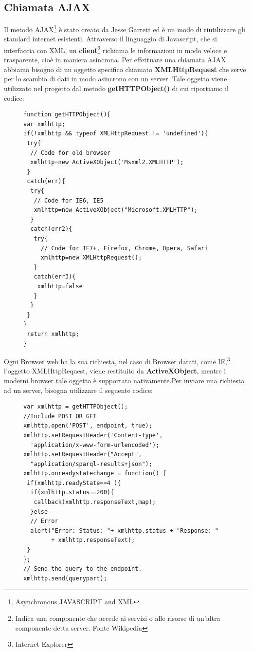 \documentclass[a4paper,11pt]{article}
\begin{document}
\subsection{Chiamata AJAX}
\label{sec:5.3}
Il metodo AJAX\footnote{Asynchronous JAVASCRIPT and XML} è stato creato da Jesse Garrett ed è un modo di riutilizzare gli standard internet esistenti. 
Attraverso il linguaggio di Javascript, che si interfaccia con XML, un \textbf{client}\footnote{Indica una componente che accede ai servizi o alle risorse di un'altra componente detta server. Fonte Wikipedia} richiama le informazioni in modo veloce e trasparente, cioè in maniera asincrona. Per effettuare una chiamata AJAX abbiamo bisogno di un oggetto specifico chiamato \textbf{XMLHttpRequest} che serve per lo scambio di dati in modo asincrono con un server.
Tale oggetto viene utilizzato nel progetto dal metodo \textbf{getHTTPObject()}
di cui riportiamo il codice:
\begin{figure}[htb]
\begin{lstlisting}[style=htmlcssjs]
function getHTTPObject(){
var xmlhttp;
if(!xmlhttp && typeof XMLHttpRequest != 'undefined'){
 try{
  // Code for old browser
  xmlhttp=new ActiveXObject('Msxml2.XMLHTTP');
 }
 catch(err){
  try{
   // Code for IE6, IE5
   xmlhttp=new ActiveXObject("Microsoft.XMLHTTP");
  }
  catch(err2){
   try{
	 // Code for IE7+, Firefox, Chrome, Opera, Safari
	 xmlhttp=new XMLHttpRequest();
   }
   catch(err3){
    xmlhttp=false
   }
  }			
 }
}
 return xmlhttp;
}		
\end{lstlisting}
\end{figure}\newline
Ogni Browser web ha la sua richiesta, nel caso di Browser datati, come IE,\footnote{Internet Explorer} l'oggetto XMLHttpRequest, viene restituito da \textbf{ActiveXObject}, mentre i moderni browser tale oggetto è supportato nativamente.\newpage Per inviare una richiesta ad un server, bisogna utilizzare il seguente codice:
\begin{figure}[htb]
\begin{lstlisting}[style=htmlcssjs]
var xmlhttp = getHTTPObject();
//Include POST OR GET
xmlhttp.open('POST', endpoint, true); 
xmlhttp.setRequestHeader('Content-type',
  'application/x-www-form-urlencoded');
xmlhttp.setRequestHeader("Accept", 
  "application/sparql-results+json");	
xmlhttp.onreadystatechange = function() {
 if(xmlhttp.readyState==4 ){
  if(xmlhttp.status==200){				
   callback(xmlhttp.responseText,map);
  }else
  // Error
  alert("Error: Status: "+ xmlhttp.status + "Response: "
		+ xmlhttp.responseText);
 }	
};
// Send the query to the endpoint.
xmlhttp.send(querypart);
\end{lstlisting}
\end{figure}\newline
\end{document}
